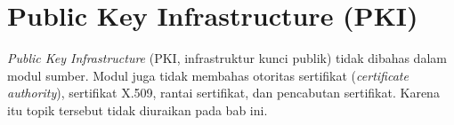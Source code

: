 \section{Public Key Infrastructure (PKI)}

\textit{Public Key Infrastructure} (PKI, infrastruktur kunci publik) tidak
dibahas dalam modul sumber. Modul juga tidak membahas otoritas sertifikat
(\textit{certificate authority}), sertifikat X.509, rantai sertifikat, dan
pencabutan sertifikat. Karena itu topik tersebut tidak diuraikan pada bab ini.
